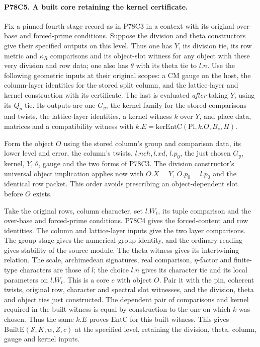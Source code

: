 \paragraph{P78C5. A built core retaining the kernel certificate.}
Fix a pinned fourth-stage record as in P78C3 in a context with
its original over-base and forced-prime conditions. Suppose the
division and theta constructors give their specified outputs on
this level. Thus one has $Y$, its division tie, its row metric and
$\kappa_R$ comparisons and its object-slot witness for any object
with these very division and row data; one also has $\theta$ with
its theta tie to $l.n$. Use the following geometric inputs at
their original scopes: a CM gauge on the host, the column-layer
identities for the stored split column, and the lattice-layer and
kernel construction with its certificate. The last is evaluated
\emph{after} taking $Y$, using its $Q_p$ tie. Its outputs are
one $G_y$, the kernel family for the stored comparisons and twists,
the lattice-layer identities, a kernel witness $k$ over $Y$, and
place data, matrices and a compatibility witness with
$k.E=\mathrm{kerEntC}(\mathrm{Pl},k.O,B_s,H)$.

Form the object $O$ using the stored column's group and comparison
data, its lower level and error, the column's twists, $l.nch,l.xd$,
$l.p_0$, the just chosen $G_y$, kernel, $Y$, $\theta$, gauge and
the two forms of P78C3. The division constructor's universal
object implication applies now with $O.X=Y$, $O.p_0=l.p_0$ and
the identical row packet. This order avoids prescribing an
object-dependent slot before $O$ exists.

Take the original rows, column character, set $l.W_t$, its tuple
comparison and the over-base and forced-prime conditions.
P78C4 gives the forced-content and row identities. The column
and lattice-layer inputs give the two layer comparisons. The group
stage gives the numerical group identity, and the ordinary reading
gives stability of the source module. The theta witness gives its
intertwining relation. The scale, archimedean signatures, real
comparison, $\eta$-factor and finite-type characters are those
of $l$; the choice $l.n$ gives its character tie and its local
parameters on $l.W_t$. This is a core $c$ with object $O$.
Pair it with the pin, coherent twists, original row, character
and spectral slot witnesses, and the division, theta and object
ties just constructed. The dependent pair of comparisons and
kernel required in the built witness is equal by construction
to the one on which $k$ was chosen. Thus the same $k.E$ proves
$\mathrm{EntC}$ for this built witness. This gives
$\mathrm{BuiltE}(\mathcal S,K,w,Z,c)$ at the specified level,
retaining the division, theta, column, gauge and kernel inputs.

